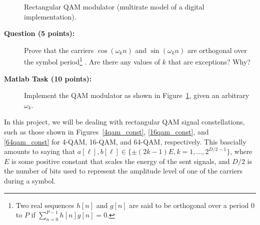 \documentclass[letterpaper,12pt]{article}
\newcounter{questioncnt}
\newcounter{matlabcnt}
\begin{document}
\begin{figure}[h]
\centering
\scalebox{.5}{}%
\caption{Rectangular QAM modulator  (multirate model of a digital implementation).\label{qam_mod}}
\end{figure}

\begin{description}
    \item[{\bf Question  (5 points):}]
    Prove that the carriers $\cos(\omega_kn)$ and $\sin(\omega_kn)$ are %
orthogonal over the symbol period\footnote{Two real sequences $h[n]$ and $g[n]$ are said to be orthogonal over a period $0$ to $P$ if $\sum_{n=0}^{P-1} h[n]g[n]=0$.} . Are there any values of $k$ that are exceptions? Why?
\end{description}

\begin{description}
    \item[{\bf Matlab Task  (10 points):}]
    Implement the QAM modulator as shown in Figure~\ref{qam_mod}, given an arbitrary $\omega_k$.
\end{description}



In this project, we will be dealing with rectangular QAM signal
constellations, such as those shown in Figures~\ref{4qam_const},
\ref{16qam_const}, and \ref{64qam_const} for 4-QAM, 16-QAM, and
64-QAM, respectively. This bascially amounts to saying that
$a[\ell], b[\ell] \in \{\pm (2k-1)E, k=1,\ldots,2^{D/2-1}\}$,
where $E$ is some positive constant that scales the energy of the
sent signals, and $D/2$ is the number of bits used to represent
the amplitude level of one of the carriers during a symbol.
\end{document}
